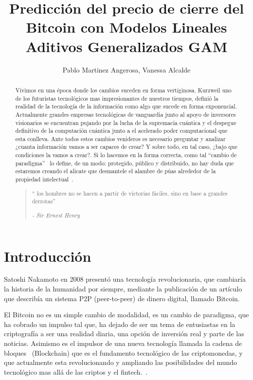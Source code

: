 \documentclass[a4paper,12pt,twocolumn]{article}
\date{ }
\title{\textbf{Predicción del precio de cierre del Bitcoin con Modelos Lineales Aditivos Generalizados GAM}}
\author{Pablo Martinez Angerosa, Vanessa Alcalde}
\begin{document}
\onecolumn

\maketitle
\begin{abstract}
Vivimos en una época donde los cambios suceden en forma vertiginosa. Kurzweil\cite{RayKurzweil} uno de los futuristas tecnológicos mas impresionantes de nuestros tiempos, definió la realidad de la tecnología de la información como algo que sucede en forma exponencial. Actualmente grandes empresas tecnológicas de vanguardia junto al apoyo de inversores visionarios se encuentran pujando por la lucha de la supremacía cuántica y el despegue definitivo de la computación cuántica junto a el  acelerado poder computacional que esta conlleva. Ante todos estos cambios venideros es necesario preguntar y analizar ¿cuanta información vamos a ser capaces de crear? Y sobre todo, en tal caso, ¿bajo que condiciones la vamos a crear?. Si lo hacemos en la forma correcta, como tal “cambio de paradigma”~\cite{LaSingularidad} lo define, de un modo: protegido, público y distribuido,  no hay duda que estaremos creando el alicate que desmantele el alambre de púas alrededor de la propiedad intelectual~\cite{ManifestoCriptoAnarquista}.
\begin{quotation}
“ los hombres no se hacen a partir de victorias fáciles, sino en base a grandes derrotas”
\begin{flushright}
{\it - Sir Ernest Henry }
\end{flushright}
\end{quotation}

\end{abstract}
\vspace{1.0cm}

\twocolumn

\section{Introducción}
 Satoshi Nakamoto en 2008 presentó una tecnología revolucionaria\cite{Satoshi}, que cambiaría la historia de la humanidad por siempre, mediante la publicación de un artículo que describía un sistema P2P (peer-to-peer) de dinero digital, llamado Bitcoin. 

El Bitcoin no es un simple cambio de modalidad, es un cambio de paradigma, que ha cobrado un impulso tal que, ha dejado de ser un tema de entusiastas en la criptografía a ser una realidad diaria, una opción de inversión real y parte de las noticias. Asimismo es el impulsor de una nueva tecnología llamada la cadena de bloques~\cite{Blockchain} (Blockchain) que es el fundamento tecnológico de las criptomonedas,  y que actualmente esta revolucionando y ampliando las posibilidades del mundo tecnológico mas allá de las criptos y el fintech.~\cite{Bitcoin_revolucion_monetaria}. 
\end{document}
